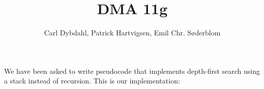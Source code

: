 \documentclass[a4paper]{article}
\title{DMA 11g}
\author{Carl Dybdahl, Patrick Hartvigsen, Emil Chr. Søderblom}
\begin{document}
\maketitle

We have been asked to write pseudocode that implements depth-first search using a stack instead of recursion. This is our implementation:

\end{document}
